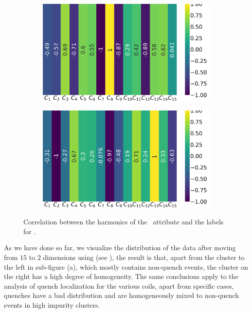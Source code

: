 \begin{figure}[!h]
\begin{subfigure}{0.49\linewidth}
	\end{subfigure}
	\begin{subfigure}{0.49\linewidth}
		\includegraphics[width=\linewidth]{img/qlp_corr/Phi_coil2.png}
	\end{subfigure}
	\begin{subfigure}{0.49\linewidth}
		\includegraphics[width=\linewidth]{img/qlp_corr/Phi_coil3.png}
	\end{subfigure}
	\caption{Correlation between the harmonics of the \phin\ attribute and the labels for \qlp.}
	\label{fig:phi-lcorr-qlp}
\end{figure}

As we have done so far, we visualize the distribution of the data after moving from $15$ to $2$
dimensions using \pca (see ), the result is that, apart from the cluster to
the left in sub-figure (a), which mostly contains non-quench events, the cluster on the right has a
high degree of homogeneity. The same conclusions apply to the analysis of quench localization for
the various coils, apart from specific cases, quenches have a bad distribution and are homogeneously
mixed to non-quench events in high impurity clusters.


